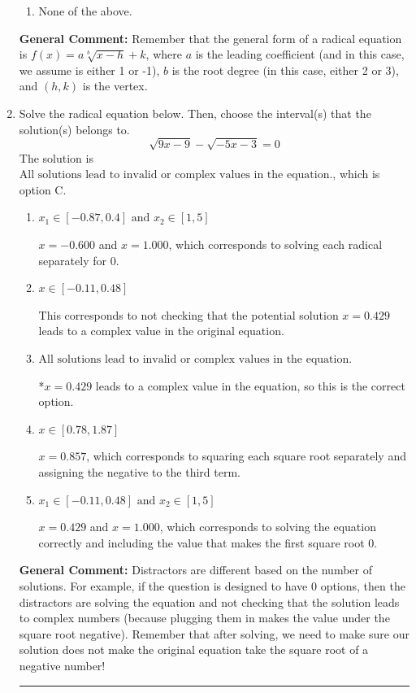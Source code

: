 \documentclass{extbook}[14pt]
\newcommand{\litem}[1]{\item #1

\rule{\textwidth}{0.4pt}}
\begin{document}
\begin{enumerate}
{\begin{enumerate}[label=\Alph*.]
\item None of the above.\end{enumerate}
\textbf{General Comment:} Remember that the general form of a radical equation is $ f(x) = a \sqrt[b]{x - h} + k $, where $a$ is the leading coefficient (and in this case, we assume is either 1 or -1), $b$ is the root degree (in this case, either 2 or 3), and $(h, k)$ is the vertex.
}
\litem{
Solve the radical equation below. Then, choose the interval(s) that the solution(s) belongs to.
\[ \sqrt{9 x - 9} - \sqrt{-5 x - 3} = 0 \]The solution is \( \text{All solutions lead to invalid or complex values in the equation.} \), which is option C.\begin{enumerate}[label=\Alph*.]
\item \( x_1 \in [-0.87, 0.4] \text{ and } x_2 \in [1,5] \)

$x = -0.600$ and $x = 1.000$, which corresponds to solving each radical separately for 0.
\item \( x \in [-0.11,0.48] \)

This corresponds to not checking that the potential solution $x = 0.429$ leads to a complex value in the original equation.
\item \( \text{All solutions lead to invalid or complex values in the equation.} \)

*$x = 0.429$ leads to a complex value in the equation, so this is the correct option.
\item \( x \in [0.78,1.87] \)

$x = 0.857$, which corresponds to squaring each square root separately and assigning the negative to the third term.
\item \( x_1 \in [-0.11, 0.48] \text{ and } x_2 \in [1,5] \)

$x = 0.429$ and $x = 1.000$, which corresponds to solving the equation correctly and including the value that makes the first square root 0.
\end{enumerate}

\textbf{General Comment:} Distractors are different based on the number of solutions. For example, if the question is designed to have 0 options, then the distractors are solving the equation and not checking that the solution leads to complex numbers (because plugging them in makes the value under the square root negative). Remember that after solving, we need to make sure our solution does not make the original equation take the square root of a negative number!
}
\end{enumerate}
\end{document}
